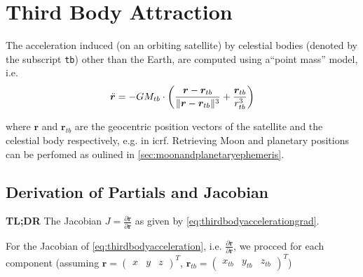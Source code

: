 \section{Third Body Attraction}\label{sec:third_body_attraction}

The acceleration induced (on an orbiting satellite) by celestial bodies 
(denoted by the subscript \texttt{tb}) other than the Earth, are computed 
using a``point mass'' model, i.e.
\begin{equation}\label{eq:thirdbodyacceleration}
  \ddot{\bm{r}} = -GM_{tb} \cdot \left( \frac{\bm{r}-\bm{r}_{tb}}{\lVert\bm{r}-\bm{r}_{tb}\rVert^3} 
    + \frac{\bm{r}_{tb}}{r_{tb}^3} \right)
\end{equation}

where $\bm{r}$ and $\bm{r}_{tb}$ are the geocentric position vectors of the 
satellite and the celestial body respectively, e.g. in \gls{icrf}. Retrieving 
Moon and planetary positions can be perfomed as oulined in \autoref{sec:moonandplanetaryephemeris}.

\subsection{Derivation of Partials and Jacobian}

\textbf{TL;DR} The Jacobian $J=\frac{\partial \ddot{\bm{r}}}{\partial \bm{r}}$ as 
given by \autoref{eq:thirdbodyaccelerationgrad}.

For the Jacobian of \autoref{eq:thirdbodyacceleration}, i.e. 
$\frac{\partial \ddot{\bm{r}}}{\partial\bm{r}}$, we procced for each component 
(assuming $\bm{r}=\begin{pmatrix}x&y&z\end{pmatrix}^{T}$, 
 $\bm{r}_{tb}=\begin{pmatrix}x_{tb}&y_{tb}&z_{tb}\end{pmatrix}^{T}$)

